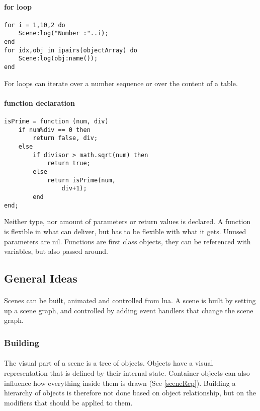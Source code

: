 \paragraph{for loop}
\begin{verbatim}
for i = 1,10,2 do
    Scene:log("Number :"..i);
end
for idx,obj in ipairs(objectArray) do
    Scene:log(obj:name());
end
\end{verbatim}
For loops can iterate over a number sequence or over the content of a table.

\paragraph{function declaration}
\begin{verbatim}
isPrime = function (num, div)
    if num%div == 0 then
        return false, div;
    else
        if divisor > math.sqrt(num) then
            return true;
        else
            return isPrime(num,
                div+1);
        end
end;
\end{verbatim}
Neither type, nor amount of parameters or return values is declared.
A function is flexible in what can deliver, but has to be flexible with what it gets.
Unused parameters are nil.
Functions are first class objects, they can be referenced with variables, but also passed around.


\subsection{General Ideas}
\paragraph{}
Scenes can be built, animated and controlled from lua.
A scene is built by setting up a scene graph, and controlled by adding event handlers that change the scene graph.

\subsubsection{Building}
\paragraph{}
The visual part of a scene is a tree of objects.
Objects have a visual representation that is defined by their internal state.
Container objects can also influence how everything inside them is drawn (See \ref{sceneRep}).
Building a hierarchy of objects is therefore not done based on object relationship,
but on the modifiers that should be applied to them.

